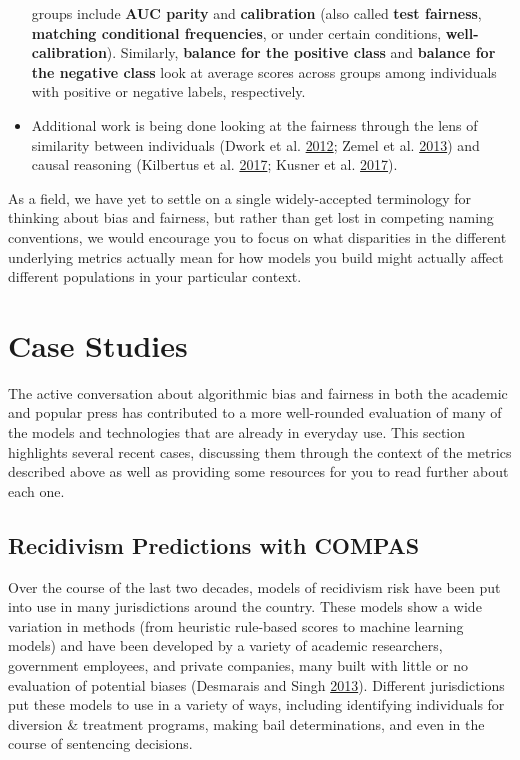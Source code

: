 \documentclass[]{krantz}
\begin{document}
\begin{itemize}
  groups include \textbf{AUC parity} and \textbf{calibration} (also
  called \textbf{test fairness}, \textbf{matching conditional
  frequencies}, or under certain conditions, \textbf{well-calibration}).
  Similarly, \textbf{balance for the positive class} and \textbf{balance
  for the negative class} look at average scores across groups among
  individuals with positive or negative labels, respectively.
\item
  Additional work is being done looking at the fairness through the lens
  of similarity between individuals (Dwork et al.
  \protect\hyperlink{ref-dwork2012}{2012}; Zemel et al.
  \protect\hyperlink{ref-zemel2013}{2013}) and causal reasoning
  (Kilbertus et al. \protect\hyperlink{ref-kilbertus2017}{2017}; Kusner
  et al. \protect\hyperlink{ref-kusner2017}{2017}).
\end{itemize}

As a field, we have yet to settle on a single widely-accepted
terminology for thinking about bias and fairness, but rather than get
lost in competing naming conventions, we would encourage you to focus on
what disparities in the different underlying metrics actually mean for
how models you build might actually affect different populations in your
particular context.

\section{Case Studies}\label{case-studies}

The active conversation about algorithmic bias and fairness in both the
academic and popular press has contributed to a more well-rounded
evaluation of many of the models and technologies that are already in
everyday use. This section highlights several recent cases, discussing
them through the context of the metrics described above as well as
providing some resources for you to read further about each one.

\subsection{Recidivism Predictions with COMPAS}\label{sec:compascase}

Over the course of the last two decades, models of recidivism risk have
been put into use in many jurisdictions around the country. These models
show a wide variation in methods (from heuristic rule-based scores to
machine learning models) and have been developed by a variety of
academic researchers, government employees, and private companies, many
built with little or no evaluation of potential biases (Desmarais and
Singh \protect\hyperlink{ref-desmarais2013}{2013}). Different
jurisdictions put these models to use in a variety of ways, including
identifying individuals for diversion \& treatment programs, making bail
determinations, and even in the course of sentencing decisions.
\end{document}
